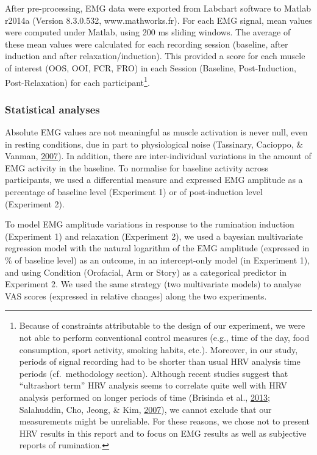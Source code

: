 \documentclass[a4paper,12pt,twoside,openright,oldfontcommands]{memoir}
\let\rmarkdownfootnote\footnote%
\def\footnote{\protect\rmarkdownfootnote}
\begin{document}
After pre-processing, EMG data were exported from Labchart software to Matlab r2014a (Version 8.3.0.532, www.mathworks.fr). For each EMG signal, mean values were computed under Matlab, using 200 ms sliding windows. The average of these mean values were calculated for each recording session (baseline, after induction and after relaxation/induction). This provided a score for each muscle of interest (OOS, OOI, FCR, FRO) in each Session (Baseline, Post-Induction, Post-Relaxation) for each participant\footnote{Because of constraints attributable to the design of our experiment, we were not able to perform conventional control measures (e.g., time of the day, food consumption, sport activity, smoking habits, etc.). Moreover, in our study, periods of signal recording had to be shorter than usual HRV analysis time periods (cf.~methodology section). Although recent studies suggest that \enquote{ultrashort term} HRV analysis seems to correlate quite well with HRV analysis performed on longer periods of time (Brisinda et al., \protect\hyperlink{ref-brisinda_comparison_2013}{2013}; Salahuddin, Cho, Jeong, \& Kim, \protect\hyperlink{ref-Salahuddin2007}{2007}), we cannot exclude that our measurements might be unreliable. For these reasons, we chose not to present HRV results in this report and to focus on EMG results as well as subjective reports of rumination.}.

\hypertarget{statistical-analyses}{%
\subsubsection{Statistical analyses}\label{statistical-analyses}}

Absolute EMG values are not meaningful as muscle activation is never null, even in resting conditions, due in part to physiological noise (Tassinary, Cacioppo, \& Vanman, \protect\hyperlink{ref-berntson_skeletomotor_2007}{2007}). In addition, there are inter-individual variations in the amount of EMG activity in the baseline. To normalise for baseline activity across participants, we used a differential measure and expressed EMG amplitude as a percentage of baseline level (Experiment 1) or of post-induction level (Experiment 2).

To model EMG amplitude variations in response to the rumination induction (Experiment 1) and relaxation (Experiment 2), we used a bayesian multivariate regression model with the natural logarithm of the EMG amplitude (expressed in \% of baseline level) as an outcome, in an intercept-only model (in Experiment 1), and using Condition (Orofacial, Arm or Story) as a categorical predictor in Experiment 2. We used the same strategy (two multivariate models) to analyse VAS scores (expressed in relative changes) along the two experiments.
\end{document}
